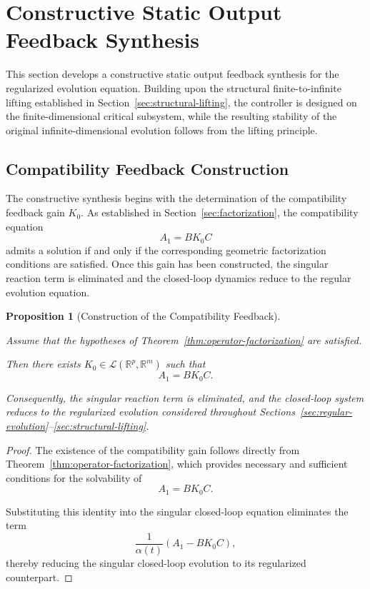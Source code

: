 \documentclass[pdflatex,sn-mathphys-num]{sn-jnl}
\theoremstyle{thmstyleone}%
\newtheorem{proposition}[theorem]{Proposition}%
\theoremstyle{thmstyletwo}%
\theoremstyle{thmstylethree}%
\begin{document}
\section{Constructive Static Output Feedback Synthesis}
\label{sec:synthesis}

This section develops a constructive static output feedback synthesis
for the regularized evolution equation. Building upon the structural
finite-to-infinite lifting established in Section~\ref{sec:structural-lifting}, the controller is designed on the finite-dimensional critical subsystem, while the resulting stability of the original infinite-dimensional evolution follows from the lifting principle.

\subsection{Compatibility Feedback Construction}
\label{subsec:compatibility-feedback}

The constructive synthesis begins with the determination of the compatibility feedback gain \(K_0\). As established in
Section~\ref{sec:factorization}, the compatibility equation
\[
A_1=BK_0C
\]
admits a solution if and only if the corresponding geometric factorization conditions are satisfied. Once this gain has been constructed, the singular reaction term is eliminated and the closed-loop dynamics reduce to the regular evolution equation.

\begin{proposition}[Construction of the Compatibility Feedback]
\label{prop:compatibility-feedback}

Assume that the hypotheses of Theorem~\ref{thm:operator-factorization} are satisfied.

Then there exists \(K_0\in\mathcal L(\mathbb R^{p},\mathbb R^{m})\)
such that
\[
A_1=BK_0C.
\]

Consequently, the singular reaction term is eliminated, and the closed-loop system reduces to the regularized evolution considered throughout Sections~\ref{sec:regular-evolution}--\ref{sec:structural-lifting}.

\end{proposition}

\begin{proof}

The existence of the compatibility gain follows directly from Theorem~\ref{thm:operator-factorization}, which provides necessary and sufficient conditions for the solvability of
\[
A_1=BK_0C.
\]

Substituting this identity into the singular closed-loop equation eliminates the term
\[
\frac1{\alpha(t)}
\left(
A_1-BK_0C
\right),
\]
thereby reducing the singular closed-loop evolution to its regularized counterpart.

\end{proof}
\end{document}
